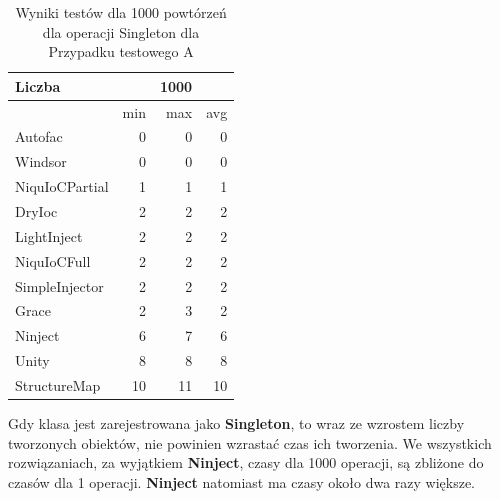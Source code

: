\documentclass[12pt]{article}
\begin{document}
\begin{table}[H]
\captionsetup{belowskip=0pt,aboveskip=0pt}
\begin{center}
\begin{small}
	\begin{tabular}{ | l | r r r | }
    		\hline
Liczba & & 1000 & \\ \hline
 & min & max & avg \\ \hline
Autofac & 0 & 0 & 0 \\ \hline
Windsor & 0 & 0 & 0 \\ \hline
NiquIoCPartial & 1 & 1 & 1 \\ \hline
DryIoc & 2 & 2 & 2 \\ \hline
LightInject & 2 & 2 & 2 \\ \hline
NiquIoCFull & 2 & 2 & 2 \\ \hline
SimpleInjector & 2 & 2 & 2 \\ \hline
Grace & 2 & 3 & 2 \\ \hline
Ninject & 6 & 7 & 6 \\ \hline
Unity & 8 & 8 & 8 \\ \hline
StructureMap & 10 & 11 & 10 \\ \hline
  	\end{tabular}
\end{small}
\end{center}
\caption{Wyniki testów dla 1000 powtórzeń dla operacji Singleton dla Przypadku testowego A}
\label{TestCaseA_Singleton1000}
\end{table}
Gdy klasa jest zarejestrowana jako \textbf{Singleton}, to wraz ze wzrostem liczby tworzonych obiektów, nie powinien wzrastać czas ich tworzenia. We wszystkich rozwiązaniach, za wyjątkiem \textbf{Ninject}, czasy dla 1000 operacji, są zbliżone do czasów dla 1 operacji. \textbf{Ninject} natomiast ma czasy około dwa razy większe.
\end{document}
